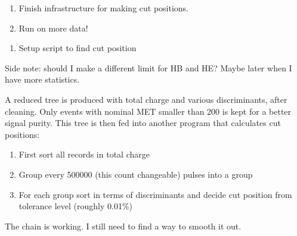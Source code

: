 

\begin{enumerate}
\item Finish infrastructure for making cut positions.
\item Run on more data!
\end{enumerate}


\begin{enumerate}
\item Setup script to find cut position
\end{enumerate}


Side note: should I make a different limit for HB and HE?  Maybe later when I have more statistics.

A reduced tree is produced with total charge and various discriminants, after cleaning.
Only events with nominal MET smaller than 200 is kept for a better signal purity.
This tree is then fed into another program that calculates cut positions:

\begin{enumerate}
\item First sort all records in total charge
\item Group every 500000 (this count changeable) pulses into a group
\item For each group sort in terms of discriminants and decide cut position from tolerance level (roughly 0.01\%)
\end{enumerate}

The chain is working.  I still need to find a way to smooth it out.
